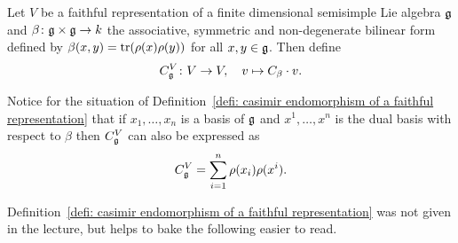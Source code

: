 \begin{defi}\label{defi: casimir endomorphism of a faithful representation}
 Let $V$ be a faithful representation of a finite dimensional semisimple Lie algebra $\mathfrak{g}$ and $\beta \colon \mathfrak{g} \times \mathfrak{g} \to k$ the associative, symmetric and non-degenerate bilinear form defined by $\beta(x,y) = \operatorname{tr}(\rho(x)\rho(y))$ for all $x,y \in \mathfrak{g}$. Then define
 \[
  C^V_{\mathfrak{g}} \colon V \to V, \quad v \mapsto C_\beta \cdot v.
 \]
\end{defi}


\begin{rem}
 Notice for the situation of Definition~\ref{defi: casimir endomorphism of a faithful representation} that if $x_1, \dotsc, x_n$ is a basis of $\mathfrak{g}$ and $x^1, \dotsc, x^n$ is the dual basis with respect to $\beta$ then $C^V_{\mathfrak{g}}$ can also be expressed as
 \[
  C^V_{\mathfrak{g}} = \sum_{i=1}^n \rho(x_i) \rho(x^i).
 \]
\end{rem}


\begin{rem}
 Definition~\ref{defi: casimir endomorphism of a faithful representation} was not given in the lecture, but helps to bake the following easier to read.
\end{rem}


